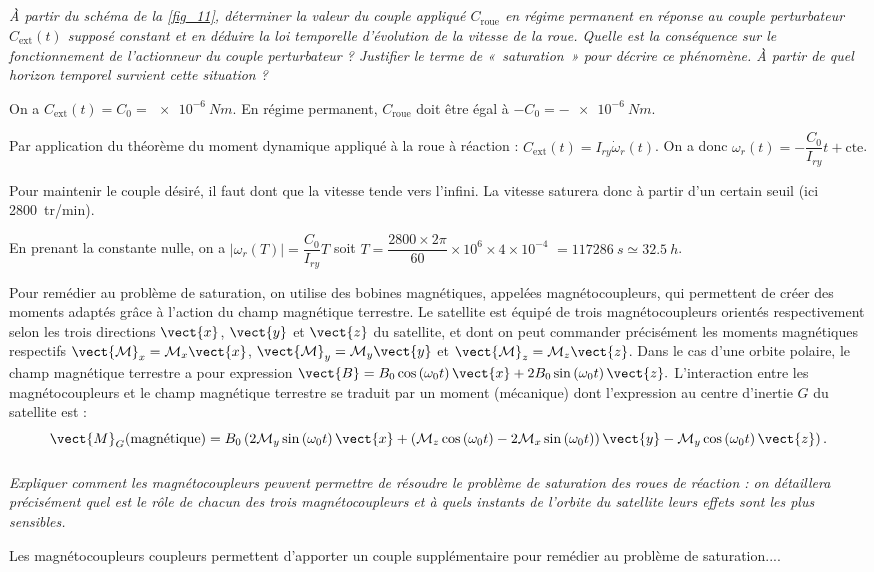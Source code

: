 \subparagraph{\label{q_32}}\textit{À partir du schéma de la \autoref{fig_11}, déterminer la valeur du couple appliqué $C_{\text{roue}}$ en régime permanent
en réponse au couple perturbateur $C_{\text{ext}}(t)$ supposé constant et en déduire la loi temporelle d’évolution de la
vitesse de la roue. Quelle est la conséquence sur le fonctionnement de l’actionneur du couple perturbateur ? Justifier le terme de «~saturation~» pour décrire ce phénomène. À partir de quel horizon temporel survient cette
situation ?}
\ifprof
\begin{corrige}
On a $C_{\text{ext}}(t) = C_0 =\SI{e-6}{Nm}$. En régime permanent, $C_{\text{roue}}$ doit être égal à $-C_0 =-\SI{e-6}{Nm}$.

Par application du théorème du moment dynamique appliqué à la roue à réaction : $C_{\text{ext}}(t) = I_{ry} \dot{\omega}_r(t)$. On a donc $\omega_r(t) = -\dfrac{C_0}{I_{ry}}t + \text{cte}$.

Pour maintenir le couple désiré, il faut dont que la vitesse tende vers l'infini. La vitesse saturera donc à partir d'un certain seuil (ici \SI{2800}{tr/min}). 

En prenant la constante nulle, on a  $|\omega_r(T)| = \dfrac{C_0}{I_{ry}}T$ soit $T = \dfrac{2800 \times 2\pi}{60} \times 10^{6} \times 4\times 10 ^{-4} $ $=\SI{117 286}{s} \simeq \SI{32,5}{h}$.


\end{corrige}
\else
\fi

\ifprof
\else


Pour remédier au problème de saturation, on utilise des bobines magnétiques, appelées magnétocoupleurs, qui
permettent de créer des moments adaptés grâce à l’action du champ magnétique terrestre. Le satellite est équipé
de trois magnétocoupleurs orientés respectivement selon les trois directions $\vect{x}$, $\vect{y}$ et $\vect{z}$ du satellite, et dont on peut
commander précisément les moments magnétiques respectifs $\vect{\mathcal{M}}_x=\mathcal{M}_x\vect{x}$, $\vect{\mathcal{M}}_y=\mathcal{M}_y\vect{y}$ et $\vect{\mathcal{M}}_z=\mathcal{M}_z\vect{z}$. Dans
le cas d’une orbite polaire, le champ magnétique terrestre a pour expression $\vect{B}=B_0 \cos\left(\omega_0 t\right) \vect{x} +2 B_0 \sin\left(\omega_0 t\right) \vect{z}.$ L’interaction entre les magnétocoupleurs et le champ magnétique terrestre se traduit par un moment (mécanique)
dont l’expression au centre d’inertie $G$ du satellite est :
$$
\vect{M}_G (\text{magnétique}) = 
B_0 \left( 
2\mathcal{M}_y \sin \left(\omega_0 t \right) \vect{x}
+ \left(
\mathcal{M}_z \cos \left(\omega_0 t \right) 
-2\mathcal{M}_x \sin\left(\omega_0 t \right) \right)\vect{y}
-\mathcal{M}_y \cos \left(\omega_0 t \right) \vect{z}
\right).
$$
\fi

\subparagraph{\label{q_33}}\textit{Expliquer comment les magnétocoupleurs peuvent permettre de résoudre le problème de saturation des
roues de réaction : on détaillera précisément quel est le rôle de chacun des trois magnétocoupleurs et à quels
instants de l’orbite du satellite leurs effets sont les plus sensibles.}
\ifprof
\begin{corrige}
Les magnétocoupleurs coupleurs permettent d'apporter un couple supplémentaire pour remédier au problème de saturation.... 
\end{corrige}
\else
\fi